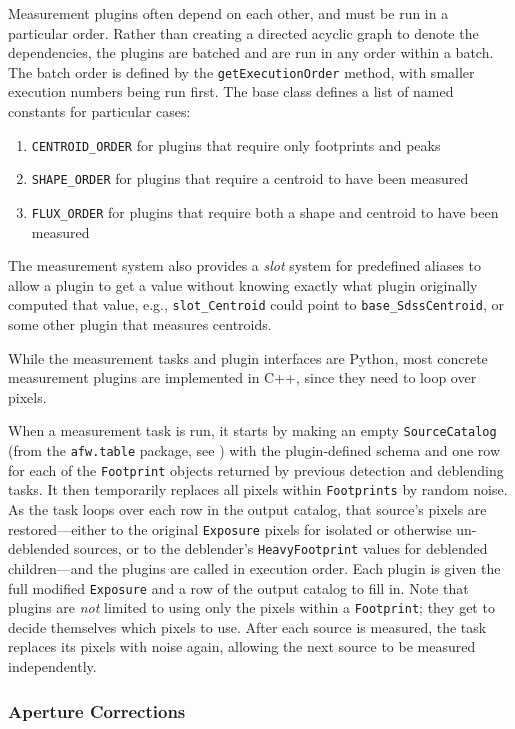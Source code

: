 Measurement plugins often depend on each other, and must be run in a particular order.
Rather than creating a directed acyclic graph to denote the dependencies, the plugins are batched and are run in any order within a batch.
The batch order is defined by the \texttt{getExecutionOrder} method, with smaller execution numbers being run first.
The base class defines a list of named constants for particular cases:
\begin{enumerate}
    \item \texttt{CENTROID\_ORDER} for plugins that require only footprints and peaks
    \item \texttt{SHAPE\_ORDER} for plugins that require a centroid to have been measured
    \item \texttt{FLUX\_ORDER} for plugins that require both a shape and centroid to have been measured
\end{enumerate}
The measurement system also provides a \textit{slot} system for predefined aliases to allow a plugin to get a value without knowing exactly what plugin originally computed that value, e.g., \texttt{slot\_Centroid} could point to \texttt{base\_SdssCentroid}, or some other plugin that measures centroids.

While the measurement tasks and plugin interfaces are Python, most concrete measurement plugins are implemented in C++, since they need to loop over pixels.

When a measurement task is run, it starts by making an empty
\texttt{SourceCatalog} (from the \texttt{afw.table} package, see ) with the plugin-defined schema and one row for each of the \texttt{Footprint} objects returned by previous detection and deblending tasks.
It then temporarily replaces all pixels within \texttt{Footprints} by random noise.
As the task loops over each row in the output catalog, that source's pixels are restored---either to the original \texttt{Exposure} pixels for isolated or otherwise un-deblended sources, or to the deblender's \texttt{HeavyFootprint} values for deblended children---and the plugins are called in execution order.
Each plugin is given the full modified \texttt{Exposure} and a row of the output catalog to fill in.
Note that plugins are \emph{not} limited to using only the pixels within a \texttt{Footprint}; they get to decide themselves which pixels to use.
After each source is measured, the task replaces its pixels with noise again, allowing the next source to be measured independently.

\subsubsection{Aperture Corrections}
\label{sec:apcorr}

